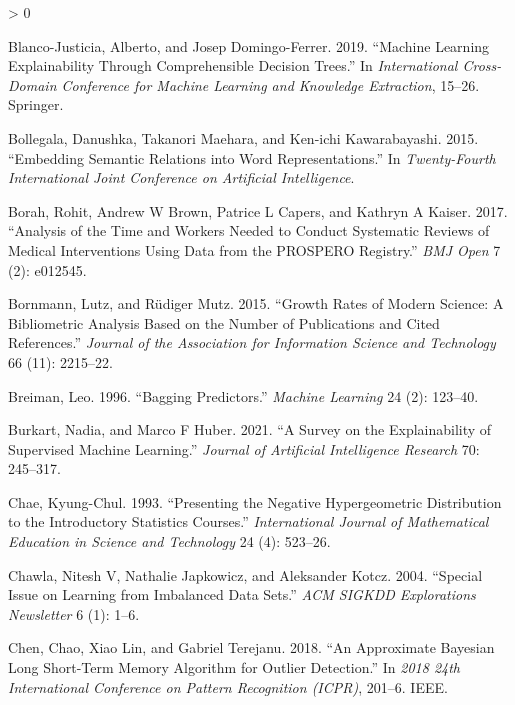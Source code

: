 \documentclass{article}
\newlength{\cslhangindent}
\newenvironment{CSLReferences}[2] %
 {%
  \setlength{\parindent}{0pt}
  \ifodd #1 \everypar{\setlength{\hangindent}{\cslhangindent}}\ignorespaces\fi
  \ifnum #2 > 0
  \setlength{\parskip}{#2\baselineskip}
  \fi
 }%
 {}
\begin{document}
\begin{CSLReferences}{1}{0}
\leavevmode\hypertarget{ref-blanco2019machine}{}%
Blanco-Justicia, Alberto, and Josep Domingo-Ferrer. 2019. {``Machine
Learning Explainability Through Comprehensible Decision Trees.''} In
\emph{International Cross-Domain Conference for Machine Learning and
Knowledge Extraction}, 15--26. Springer.

\leavevmode\hypertarget{ref-bollegala2015embedding}{}%
Bollegala, Danushka, Takanori Maehara, and Ken-ichi Kawarabayashi. 2015.
{``Embedding Semantic Relations into Word Representations.''} In
\emph{Twenty-Fourth International Joint Conference on Artificial
Intelligence}.

\leavevmode\hypertarget{ref-borah2017analysis}{}%
Borah, Rohit, Andrew W Brown, Patrice L Capers, and Kathryn A Kaiser.
2017. {``Analysis of the Time and Workers Needed to Conduct Systematic
Reviews of Medical Interventions Using Data from the PROSPERO
Registry.''} \emph{BMJ Open} 7 (2): e012545.

\leavevmode\hypertarget{ref-bornmann2015growth}{}%
Bornmann, Lutz, and Rüdiger Mutz. 2015. {``Growth Rates of Modern
Science: A Bibliometric Analysis Based on the Number of Publications and
Cited References.''} \emph{Journal of the Association for Information
Science and Technology} 66 (11): 2215--22.

\leavevmode\hypertarget{ref-breiman1996bagging}{}%
Breiman, Leo. 1996. {``Bagging Predictors.''} \emph{Machine Learning} 24
(2): 123--40.

\leavevmode\hypertarget{ref-burkart2021survey}{}%
Burkart, Nadia, and Marco F Huber. 2021. {``A Survey on the
Explainability of Supervised Machine Learning.''} \emph{Journal of
Artificial Intelligence Research} 70: 245--317.

\leavevmode\hypertarget{ref-chae1993presenting}{}%
Chae, Kyung-Chul. 1993. {``Presenting the Negative Hypergeometric
Distribution to the Introductory Statistics Courses.''}
\emph{International Journal of Mathematical Education in Science and
Technology} 24 (4): 523--26.

\leavevmode\hypertarget{ref-chawla2004special}{}%
Chawla, Nitesh V, Nathalie Japkowicz, and Aleksander Kotcz. 2004.
{``Special Issue on Learning from Imbalanced Data Sets.''} \emph{ACM
SIGKDD Explorations Newsletter} 6 (1): 1--6.

\leavevmode\hypertarget{ref-chen2018approximate}{}%
Chen, Chao, Xiao Lin, and Gabriel Terejanu. 2018. {``An Approximate
Bayesian Long Short-Term Memory Algorithm for Outlier Detection.''} In
\emph{2018 24th International Conference on Pattern Recognition (ICPR)},
201--6. IEEE.


\end{CSLReferences}
\end{document}
